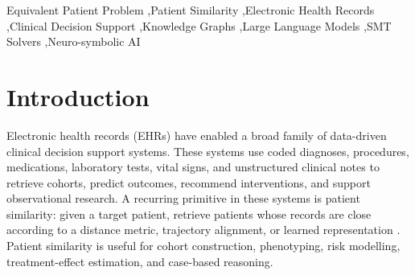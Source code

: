\documentclass[english,5p,twocolumn,preprint]{elsarticle}
\begin{document}
\begin{frontmatter}
\begin{abstract}
The framework distinguishes unqualified \emph{Equivalent} (which requires agreement across an approved policy set) from \emph{Equivalent under Guideline}, \emph{Non-equivalent}, \emph{Indeterminate}, and the eligibility status \emph{Out of scope}. This conservative design separates policy-relative equivalence from cases in which data are insufficient or comparison is clinically incoherent. The paper provides a formal definition, system architecture, verification conditions, illustrative diabetes, osteoporosis, and ophthalmic examples, together with an evaluation protocol. The accompanying public package provides synthetic fixtures, tests, and an audit-oriented implementation of the protocol; it does not contain patient-level BioArc data or establish clinical performance. The contribution is therefore conceptual, methodological, and software-oriented: it reframes patient similarity as decision equivalence without treating neural models as clinical oracles.
\end{abstract}

\begin{keyword}
Equivalent Patient Problem \sep Patient Similarity \sep Electronic Health Records \sep Clinical Decision Support \sep Knowledge Graphs \sep Large Language Models \sep SMT Solvers \sep Neuro-symbolic AI
\end{keyword}

\end{frontmatter}


\section{Introduction}
Electronic health records (EHRs) have enabled a broad family of data-driven clinical decision support systems. These systems use coded diagnoses, procedures, medications, laboratory tests, vital signs, and unstructured clinical notes to retrieve cohorts, predict outcomes, recommend interventions, and support observational research. A recurring primitive in these systems is patient similarity: given a target patient, retrieve patients whose records are close according to a distance metric, trajectory alignment, or learned representation \cite{allam2021patient,si2021deep,shickel2018deep}. Patient similarity is useful for cohort construction, phenotyping, risk modelling, treatment-effect estimation, and case-based reasoning.
\end{document}
